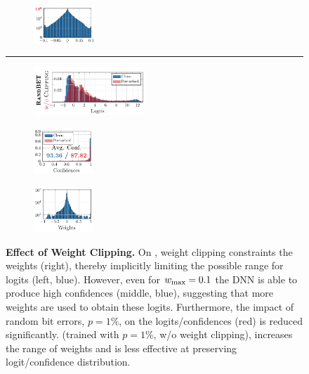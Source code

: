 \begin{figure}[t]
\begin{subfigure}{0.12\textwidth}
		\includegraphics[height=1.425cm]{c10_q801auunfp_nt_original_weights.pdf}
	\end{subfigure}
	
	\hspace*{-0.3cm}
	{\color{black!25!white}\rule{0.5\textwidth}{0.5px}}
	
	\hspace*{-0.4cm}
	\begin{subfigure}{0.24\textwidth}
		\vspace*{0px}
		
		\includegraphics[height=1.825cm]{c10_q81auunrfp_sawt_bit_random_g001_pop1_logits.pdf}
	\end{subfigure}
	\begin{subfigure}{0.12\textwidth}
		\vspace*{0px}
		
		\includegraphics[height=1.7cm]{c10_q81auunrfp_sawt_bit_random_g001_pop1_confidences.pdf}
	\end{subfigure}
	\begin{subfigure}{0.12\textwidth}
		\vspace*{3px}
		
		\includegraphics[height=1.7cm]{c10_q81auunrfp_sawt_bit_random_g001_pop1_weights.pdf}
	\end{subfigure}
	
	\vspace*{-8px}
	\caption{\textbf{Effect of Weight Clipping.} On \CifarT, weight clipping constraints the weights (right), thereby implicitly limiting the possible range for logits (left, {\color{colorbrewer2}blue}).
	However, even for $\wmax = 0.1$ the DNN is able to produce high confidences (middle, {\color{colorbrewer2}blue}), suggesting that more weights are used to obtain these logits. Furthermore, the impact of random bit errors, $p = 1\%$, on the logits/confidences ({\color{colorbrewer1}red}) is reduced significantly. \Random (trained with $p = 1\%$, w/o weight clipping), increases the range of weights and is less effective at preserving logit/confidence distribution. %
	}
	\label{fig:clipping}
	\vspace*{-0.2cm}
\end{figure}

